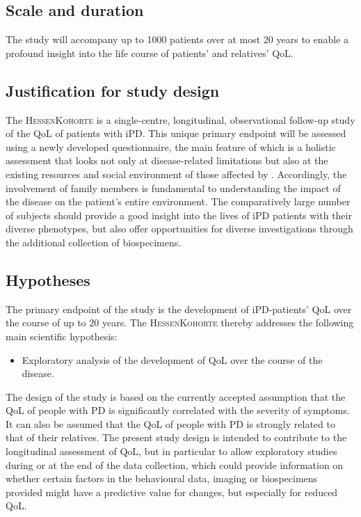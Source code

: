 \subsection{Scale and duration}
The study will accompany up to \num[round-precision = 0, round-mode = places]{1000}{} patients over at most 20 years to enable a profound insight into the life course of patients' and relatives' \ac{QoL}.

\subsection{Justification for study design}
The \textsc{HessenKohorte} is a single-centre, longitudinal, observational follow-up study of the \ac{QoL} of patients with \ac{iPD}. This unique primary endpoint will be assessed using a newly developed questionnaire, the main feature of which is a holistic assessment that looks not only at disease-related limitations but also at the existing resources and social environment of those affected by \cite{thieken2022jpd}. Accordingly, the involvement of family members is fundamental to understanding the impact of the disease on the patient's entire environment. The comparatively large number of subjects should provide a good insight into the lives of \ac{iPD} patients with their diverse phenotypes, but also offer opportunities for diverse investigations through the additional collection of biospecimens.

\subsection{Hypotheses}
\label{sec:hypoTheses}
The primary endpoint of the study is the development of \ac{iPD}-patients' \ac{QoL} over the course of up to 20 years. The \textsc{HessenKohorte} thereby addresses the following main scientific hypothesis:
\begin{itemize}
  \item Exploratory analysis of the development of \acl{QoL} over the course of the disease.
\end{itemize}
The design of the study is based on the currently accepted assumption that the \ac{QoL} of people with PD is significantly correlated with the severity of symptoms. It can also be assumed that the \ac{QoL} of people with PD is strongly related to that of their relatives. The present study design is intended to contribute to the longitudinal assessment of \ac{QoL}, but in particular to allow exploratory studies during or at the end of the data collection, which could provide information on whether certain factors in the behavioural data, imaging or biospecimens provided might have a predictive value for changes, but especially for reduced QoL.


